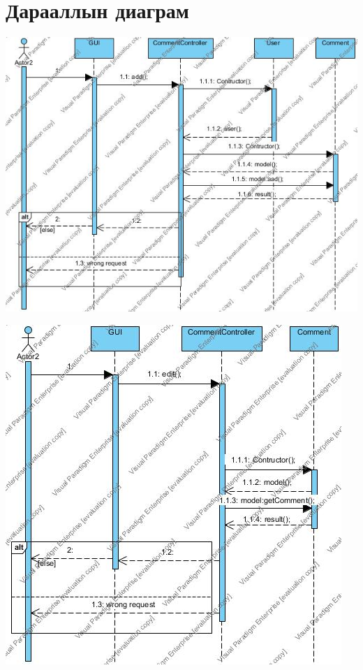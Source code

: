 \documentclass[12pt]{article}
\begin{document}
	\section{Дарааллын диаграм}
	\includegraphics[scale=0.5]{Sequence01} 
	
	\includegraphics[scale=0.5]{Sequence02} 
	
	
\end{document}
